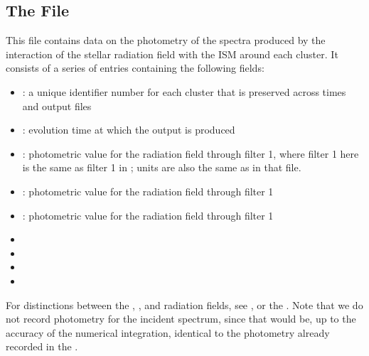 \documentclass[letterpaper,10pt,english]{sphinxmanual}
\begin{document}
\subsection{The  File}
\label{\detokenize{cloudy:the-cluster-cloudyphot-file}}
This file contains data on the photometry of the spectra produced by
the interaction of the stellar radiation field with the ISM around
each cluster. It consists of a series of entries containing the
following fields:
\begin{itemize}
\item {} 
: a unique identifier number for each cluster that is
preserved across times and output files

\item {} 
: evolution time at which the output is produced

\item {} 
: photometric value for the 
radiation field through filter 1, where filter 1 here is the same as
filter 1 in {\hyperref[\detokenize{output:ssec-int-phot-file}]{}}; units are also the same as
in that file.

\item {} 
: photometric value for the 
radiation field through filter 1

\item {} 
: photometric value for the
 radiation field through filter 1

\item {} 

\item {} 

\item {} 

\item {} 

\end{itemize}

For distinctions between the , , and
 radiation fields, see
{\hyperref[\detokenize{cloudy:sssec-int-cloudyspec-file}]{}}, or the . Note that we do not record photometry for the
incident spectrum, since that would be, up to the accuracy of the
numerical integration, identical to the photometry already recorded in
the {\hyperref[\detokenize{output:ssec-cluster-phot-file}]{}}.
\end{document}
